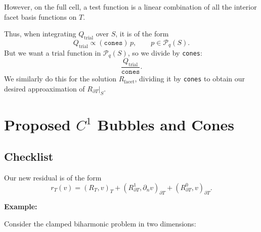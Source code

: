 \documentclass[12pt,a4paper]{article}
\newcommand{\PP}{\mathcal{P}}
\newcommand{\qtrial}{Q_{\mathrm{trial}}}
\newcommand{\rFacet}{R_{\mathrm{facet}}}
\newcommand{\dn}{\partial_n}
\newcommand{\Rone}{R_{\partial T}^{1}}
\newcommand{\Rzero}{R_{\partial T}^{0}}
\begin{document}
\begin{enumerate}[label=\roman*)]
    However, on the full cell, a test function is a linear combination of all the interior facet basis functions on $T$.

    Thus, when integrating $\qtrial$ over $S$, it is of the form
    \begin{equation}
        \qtrial\propto (\texttt{cones})\,p,
        \qquad p\in\PP_q(S).
    \end{equation}
    But we want a trial function in $\PP_q(S)$, so we divide by \texttt{cones}:
    \begin{equation}
        \frac{\qtrial}{\texttt{cones}}.
    \end{equation}
    We similarly do this for the solution $\rFacet$, dividing it by \texttt{cones} to obtain our desired approaximation of $R_{\partial T} |_S$.
\end{enumerate}

\newpage

\section{Proposed $C^1$ Bubbles and Cones}

\subsection{Checklist}

Our new residual is of the form
\begin{equation}
    r_T(v)
    =(R_T,v)_T
      +(\Rone,\dn v)_{\partial T}
      +(\Rzero,v)_{\partial T}.
\end{equation}

\textbf{Example:}

Consider the clamped biharmonic problem in two dimensions:
\end{document}
